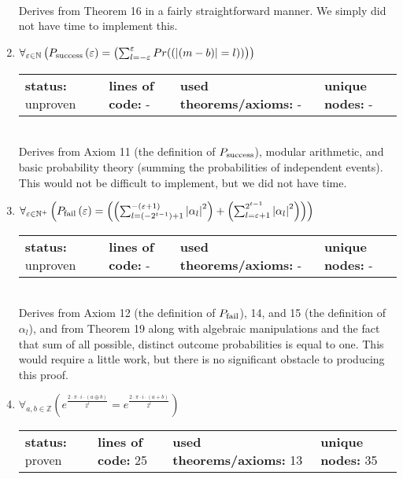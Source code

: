 \documentclass{article}[12pt]
\begin{document}
\begin{enumerate}
\begin{tabular}{l | l | l | l}
  \end{tabular} \hfill \\
Derives from Theorem 16 in a fairly straightforward manner.  We simply did not have time to implement this.
\item $\forall_{\varepsilon \in \mathbb{N}} \left(P_{\rm success}\left(\varepsilon\right) = \left(\sum_{l=-\varepsilon}^{\varepsilon} Pr(\left(\left|\left(m - b\right)\right| = l\right))\right)\right)$ \hfill \\
  \begin{tabular}{l | l | l | l}
    \textbf{status:} unproven & \textbf{lines of code:} - & \textbf{used theorems/axioms:} - & \textbf{unique nodes:} -
  \end{tabular} \hfill \\
Derives from Axiom 11 (the definition of $P_{\rm success}$), modular arithmetic, and basic probability theory (summing the probabilities of independent events).  This would not be difficult to implement, but we did not have time.
\item $\forall_{\varepsilon \in \mathbb{N}^+} \left(P_{\rm fail}\left(\varepsilon\right) = \left(\left(\sum_{l=\left(-2^{t - 1}\right) + 1}^{-\left(\varepsilon + 1\right)} \left|\alpha_{l}\right|^{2}\right) + \left(\sum_{l=\varepsilon + 1}^{2^{t - 1}} \left|\alpha_{l}\right|^{2}\right)\right)\right)$ \hfill \\
  \begin{tabular}{l | l | l | l}
    \textbf{status:} unproven & \textbf{lines of code:} - & \textbf{used theorems/axioms:} - & \textbf{unique nodes:} -    
  \end{tabular} \hfill \\
Derives from Axiom 12 (the definition of $P_{\rm fail}$), 14, and 15 (the definition of $\alpha_l$), and from Theorem 19 along with algebraic manipulations and the fact that sum of all possible, distinct outcome probabilities is equal to one.  This would require a little work, but there is no significant obstacle to producing this proof.
\item $\forall_{a, b \in \mathbb{Z}} \left(e^{\frac{2 \cdot \pi \cdot i \cdot \left(a \oplus b\right)}{2^{t}}} = e^{\frac{2 \cdot \pi \cdot i \cdot \left(a + b\right)}{2^{t}}}\right)$ \hfill \\
  \begin{tabular}{l | l | l | l}
    \textbf{status:} proven & \textbf{lines of code:} 25 & \textbf{used theorems/axioms:} 13 & \textbf{unique nodes:} 35
  \end{tabular} \hfill \\

\end{enumerate}
\end{document}
